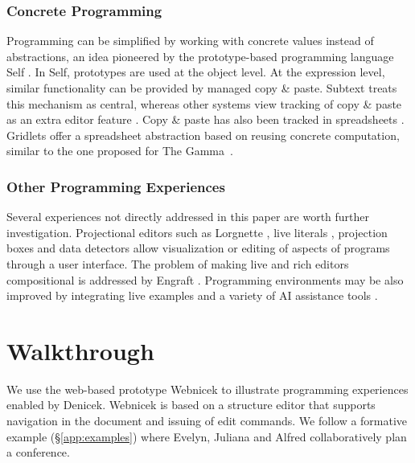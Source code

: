 \documentclass[sigconf]{acmart}
\newcommand{\diff}[1]{{#1}}
\newcommand{\note}[1]{}
\begin{document}
\subsubsection*{Concrete Programming}
Programming can be simplified by working with concrete values instead of abstractions, an idea
pioneered by the prototype-based programming language Self \cite{ungar-1987-self}. In Self,
prototypes are used at the object level. At the expression level, similar functionality can be provided
by managed copy \& paste. Subtext \cite{edwards-2006-copypaste,edwards-2022-copypaste} treats this
mechanism as central, whereas other systems view tracking of copy \& paste as an extra
editor feature \cite{jablonski-2007-cren,toomim-2004-linked}. Copy \& paste has also been
tracked in spreadsheets \cite{hermans-2015-copypaste}. Gridlets \cite{joharizadeh-2020-gridlets}
offer a spreadsheet abstraction based on reusing concrete computation, similar to the one proposed
for The Gamma~\cite{petricek-2020-live}.

\subsubsection*{Other Programming Experiences}
Several experiences not directly addressed in this paper are worth further investigation.
Projectional editors such as Lorgnette \cite{gobert-2023-lorgnette},
live literals \cite{omar-2021-livelits}, projection boxes \cite{lerner-2020-boxes} and data detectors
\cite{nardi-1998-agents} allow visualization or editing of aspects of programs through a user interface.
The problem of making live and rich editors compositional is addressed by
Engraft \cite{horowitz-2023-engraft}. Programming environments may be also improved by integrating
live examples \cite{rauch-2019-babylonian} and a variety of AI assistance
tools \cite{petricek-2023-aias,blinn-2024-llms,mcnutt-2023-nbai}.



\section{Walkthrough}
\label{sec:walk}

We use the web-based prototype Webnicek to illustrate programming experiences enabled by Denicek.
Webnicek is based on a structure editor that supports navigation in the document and issuing of
edit commands. \diff{We follow a formative example (\S\ref{app:examples}) where Evelyn, Juliana and Alfred
collaboratively plan a conference.}
\note{Turn this into a concrete user story consistent with the video. Also add more details about
the edit operations and UI interactions.}
\end{document}
